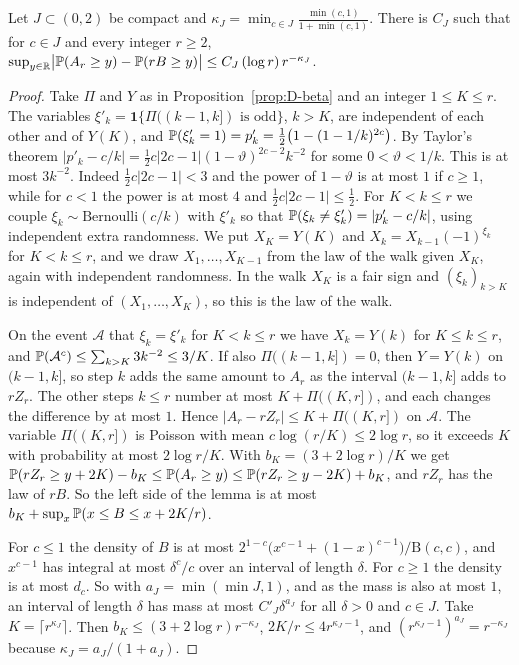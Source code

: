 \begin{lemma}[coupling]\label{lem:D-coupling}
Let $J\subset(0,2)$ be compact and $\kappa_J=\min_{c\in J}\frac{\min(c,1)}{1+\min(c,1)}$. There
is $C_J$ such that for $c\in J$ and every integer $r\ge2$,
$\sup_{y\in\mathbb R}\bigl|\mathbb{P}(A_r\ge y)-\mathbb{P}(rB\ge y)\bigr|\le C_J\,(\log r)\,r^{-\kappa_J}$.
\end{lemma}

\begin{proof}
Take $\Pi$ and $Y$ as in Proposition~\ref{prop:D-beta} and an integer $1\le K\le r$. The
variables $\xi'_k=\mathbf 1\{\Pi((k-1,k])\text{ is odd}\}$, $k>K$, are independent of each
other and of $Y(K)$, and $\mathbb{P}(\xi'_k=1)=p'_k=\frac12\bigl(1-(1-1/k)^{2c}\bigr)$. By Taylor's
theorem $|p'_k-c/k|=\frac12c|2c-1|(1-\vartheta)^{2c-2}k^{-2}$ for some $0<\vartheta<1/k$. This
is at most $3k^{-2}$. Indeed $\frac12c|2c-1|<3$ and the power of $1-\vartheta$ is at most $1$
if $c\ge1$, while for $c<1$ the power is at most $4$ and $\frac12c|2c-1|\le\frac12$. For
$K<k\le r$ we couple $\xi_k\sim\text{Bernoulli}(c/k)$ with $\xi'_k$ so that
$\mathbb{P}(\xi_k\ne\xi'_k)=|p'_k-c/k|$, using independent extra randomness. We put $X_K=Y(K)$ and
$X_k=X_{k-1}(-1)^{\xi_k}$ for $K<k\le r$, and we draw $X_1,\dots,X_{K-1}$ from the law of the
walk given $X_K$, again with independent randomness. In the walk $X_K$ is a fair sign and
$(\xi_k)_{k>K}$ is independent of $(X_1,\dots,X_K)$, so this is the law of the walk.

On the event $\mathcal A$ that $\xi_k=\xi'_k$ for $K<k\le r$ we have $X_k=Y(k)$ for
$K\le k\le r$, and $\mathbb{P}(\mathcal A^c)\le\sum_{k>K}3k^{-2}\le3/K$. If also
$\Pi((k-1,k])=0$, then $Y=Y(k)$ on $(k-1,k]$, so step $k$ adds the same amount to $A_r$ as the
interval $(k-1,k]$ adds to $rZ_r$. The other steps $k\le r$ number at most $K+\Pi((K,r])$, and
each changes the difference by at most $1$. Hence $|A_r-rZ_r|\le K+\Pi((K,r])$ on $\mathcal A$.
The variable $\Pi((K,r])$ is Poisson with mean $c\log(r/K)\le2\log r$, so it exceeds $K$ with
probability at most $2\log r/K$. With $b_K=(3+2\log r)/K$ we get
$\mathbb{P}(rZ_r\ge y+2K)-b_K\le\mathbb{P}(A_r\ge y)\le\mathbb{P}(rZ_r\ge y-2K)+b_K$, and $rZ_r$ has the law
of $rB$. So the left side of the lemma is at most $b_K+\sup_x\mathbb{P}(x\le B\le x+2K/r)$.

For $c\le1$ the density of $B$ is at most
$2^{1-c}\bigl(x^{c-1}+(1-x)^{c-1}\bigr)/\mathrm B(c,c)$, and $x^{c-1}$ has integral at most
$\delta^c/c$ over an interval of length $\delta$. For $c\ge1$ the density is at most $d_c$. So
with $a_J=\min(\min J,1)$, and as the mass is also at most $1$, an interval of length $\delta$
has mass at most $C'_J\delta^{a_J}$ for all $\delta>0$ and $c\in J$. Take
$K=\lceil r^{\kappa_J}\rceil$. Then $b_K\le(3+2\log r)r^{-\kappa_J}$, $2K/r\le4r^{\kappa_J-1}$, and
$(r^{\kappa_J-1})^{a_J}=r^{-\kappa_J}$ because $\kappa_J=a_J/(1+a_J)$.
\end{proof}

